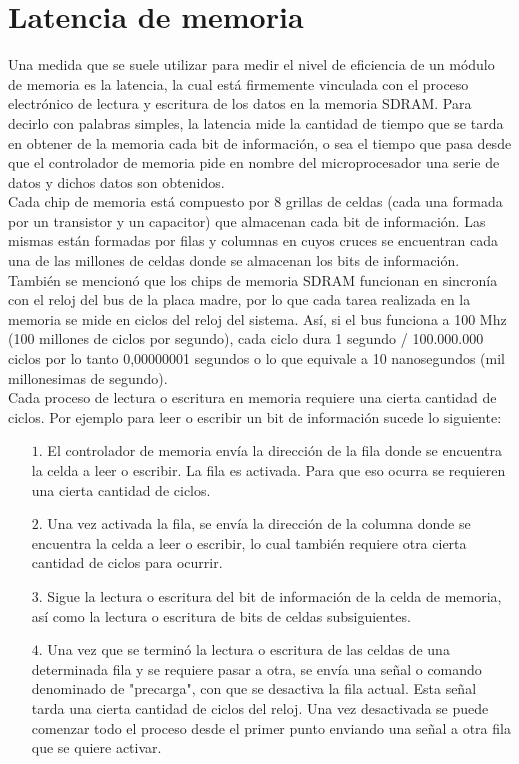 \documentclass{article}
\begin{document}
\section*{Latencia de memoria}
Una medida que se suele utilizar para medir el nivel de eficiencia de un módulo de memoria es
la latencia, la cual está firmemente vinculada con el proceso electrónico de lectura y escritura
de los datos en la memoria SDRAM. Para decirlo con palabras simples, la latencia mide la
cantidad de tiempo que se tarda en obtener de la memoria cada bit de información, o sea el
tiempo que pasa desde que el controlador de memoria pide en nombre del microprocesador
una serie de datos y dichos datos son obtenidos.\\[0.1cm]
Cada chip de memoria está compuesto por 8 grillas de celdas (cada una formada por un
transistor y un capacitor) que almacenan cada bit de información. Las mismas están formadas
por filas y columnas en cuyos cruces se encuentran cada una de las millones de celdas donde se
almacenan los bits de información.\\[0.1cm]
También se mencionó que los chips de memoria SDRAM funcionan en sincronía con el reloj del
bus de la placa madre, por lo que cada tarea realizada en la memoria se mide en ciclos del reloj
del sistema. Así, si el bus funciona a 100 Mhz (100 millones de ciclos por segundo), cada ciclo
dura 1 segundo / 100.000.000 ciclos por lo tanto 0,00000001 segundos o lo que equivale a
10 nanosegundos (mil millonesimas de segundo).\\[0.1cm]
Cada proceso de lectura o escritura en memoria requiere una cierta cantidad de ciclos. Por
ejemplo para leer o escribir un bit de información sucede lo siguiente:
\begin{itemize}
\item[$1.$] El controlador de memoria envía la dirección de la fila donde se encuentra la celda a leer o
escribir. La fila es activada. Para que eso ocurra se requieren una cierta cantidad de ciclos.
\item [$2.$] Una vez activada la fila, se envía la dirección de la columna donde se encuentra la celda a
leer o escribir, lo cual también requiere otra cierta cantidad de ciclos para ocurrir.
\item [$3.$] Sigue la lectura o escritura del bit de información de la celda de memoria, así como la lectura o escritura de bits de celdas subsiguientes.
\item [$4.$] Una vez que se terminó la lectura o escritura de las celdas de una determinada fila y se
requiere pasar a otra, se envía una señal o comando denominado de "precarga", con que se
desactiva la fila actual. Esta señal tarda una cierta cantidad de ciclos del reloj. Una vez
desactivada se puede comenzar todo el proceso desde el primer punto enviando una señal
a otra fila que se quiere activar.
\end{itemize}
\end{document}
